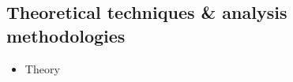 \subsection{Theoretical techniques \& analysis methodologies}

\begin{itemize}
\item Theory 
\end{itemize}